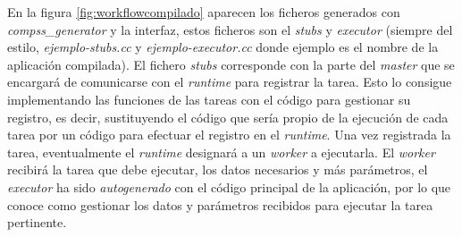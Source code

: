 \bigskip
En la figura \ref{fig:workflowcompilado} aparecen los ficheros generados con \textit{compss\_generator} y la interfaz, estos ficheros son el \textit{stubs} y \textit{executor} (siempre del estilo, \textit{ejemplo-stubs.cc} y \textit{ejemplo-executor.cc} donde ejemplo es el nombre de la aplicación compilada). El fichero \textit{stubs} corresponde con la parte del \textit{master} que se encargará de comunicarse con el \textit{runtime} para registrar la tarea. Esto lo consigue implementando las funciones de las tareas con el código para gestionar su registro, es decir, sustituyendo el código que sería propio de la ejecución de cada tarea por un código para efectuar el registro en el \textit{runtime}. Una vez registrada la tarea, eventualmente el \textit{runtime} designará a un \textit{worker} a ejecutarla. El \textit{worker} recibirá la tarea que debe ejecutar, los datos necesarios y más parámetros, el \textit{executor} ha sido \textit{autogenerado} con el código principal de la aplicación, por lo que conoce como gestionar los datos y parámetros recibidos para ejecutar la tarea pertinente. 

\begin{comment}
\begin{figure}[H]
    \centering  
    \caption{Registro y ejecución de tareas en una aplicación COMPSs C/C++.}
    \texttt{[image: stubs-executor.png]}
    \label{fig:stubs-executor}
\end{figure}

La imagen anterior muestra las llamadas a funciones pertinentes a \textit{stubs} que contienen el código para registrar las tareas en el \textit{runtime}, la eventual ejecución de las tareas registradas en los \textit{workers} que haya disponibles y como toma parte su ejecución mediante el \textit{executor}. Ahora que sabemos como se estructura un \textit{binding}, y en concreto, como funciona el de \textit{C/C++}, el siguiente paso es estudiar el funcionamiento de \textit{OmpSs-2}.


\subsubsection{Mercurium}

\textit{Mercurium} es el encargado de compilar una aplicación de \textit{OmpSs-2} y hacer que las directivas insertadas en el código tengan efecto sobre este. De manera superficial, lo que hace es añadir código para gestionar el \textit{runtime}, encender el \textit{runtime}, añadir las tareas, notificar las dependencias y un largo etcétera. 

\subsubsection{Nanos6}

\todo{Pensar algo}
\end{comment}

